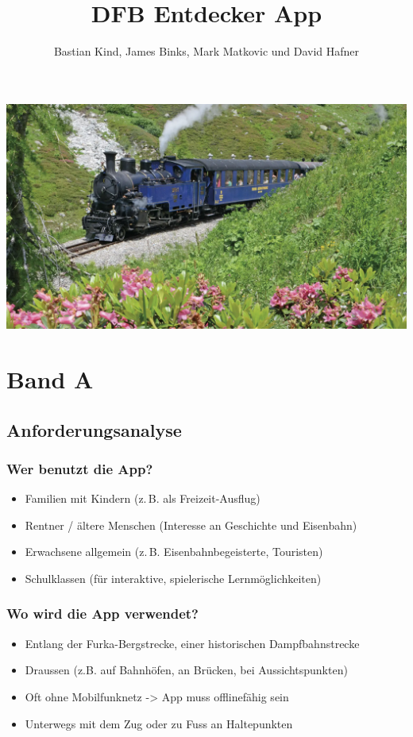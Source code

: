 \documentclass[10pt]{article}
\title{DFB Entdecker App}
\author{Bastian Kind, James Binks, Mark Matkovic und David Hafner}
\begin{document}
	\maketitle
	\includegraphics[width=17.5cm]{title}
	\pagebreak
	\tableofcontents
	\pagebreak
	\section{Band A}
	\subsection{Anforderungsanalyse}
	\subsubsection[Wer]{Wer benutzt die App?}
	\begin{itemize}
		\item Familien mit Kindern (z.\,B. als Freizeit-Ausflug)
		\item Rentner / ältere Menschen (Interesse an Geschichte und Eisenbahn)
		\item Erwachsene allgemein (z.\,B. Eisenbahnbegeisterte, Touristen)
		\item Schulklassen (für interaktive, spielerische Lernmöglichkeiten)
	\end{itemize}
	\subsubsection[Wo]{Wo wird die App verwendet?}
	\begin{itemize}
		\item Entlang der Furka-Bergstrecke, einer historischen Dampfbahnstrecke
		\item Draussen (z.B. auf Bahnhöfen, an Brücken, bei Aussichtspunkten)
		\item Oft ohne Mobilfunknetz -> App muss offlinefähig sein
		\item Unterwegs mit dem Zug oder zu Fuss an Haltepunkten
	\end{itemize}
\end{document}
